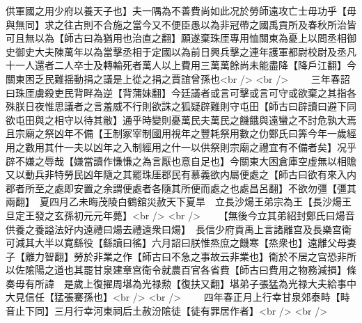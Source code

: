 供軍國之用少府以養天子也】夫一隅為不善費尚如此况於勞師遠攻亡士毋功乎【毋與無同】求之往古則不合施之當今又不便臣愚以為非冠帶之國禹貢所及春秋所治皆可且無以為【師古曰為猶用也治直之翻】願遂棄珠厓專用恤關東為憂上以問丞相御史御史大夫陳萬年以為當擊丞相于定國以為前日興兵擊之連年護軍都尉校尉及丞凡十一人還者二人卒士及轉輸死者萬人以上費用三萬萬餘尚未能盡降【降戶江翻】今關東困乏民難揺動捐之議是上從之捐之賈誼曾孫也<br />
<br />
　　三年春詔曰珠厓虜殺吏民背畔為逆【背蒲妹翻】今廷議者或言可擊或言可守或欲棄之其指各殊朕日夜惟思議者之言羞威不行則欲誅之狐疑辟難則守屯田【師古曰辟讀曰避下同欲屯田與之相守以待其敝】通乎時變則憂萬民夫萬民之饑餓與遠蠻之不討危孰大焉且宗廟之祭凶年不備【王制冢宰制國用視年之豐耗祭用數之仂鄭氏曰筭今年一歲經用之數用其什一夫以凶年之入制經用之什一以供祭則宗廟之禮宜有不備者矣】况乎辟不嫌之辱哉【嫌當讀作慊慊之為言厭也意自足也】今關東大困倉庫空虛無以相贍又以動兵非特勞民凶年隨之其罷珠厓郡民有慕義欲内屬便處之【師古曰欲有來入内郡者所至之處即安置之余謂便處者各隨其所便而處之也處昌呂翻】不欲勿彊【彊其兩翻】　夏四月乙未晦茂陵白鶴舘災赦天下夏旱　立長沙煬王弟宗為王【長沙煬王旦定王發之玄孫初元元年薨】<br />
<br />
　　【無後今立其弟紹封鄭氏曰煬音供養之養謚法好内遠禮曰煬去禮遠衆曰煬】　長信少府貢禹上言諸離宫及長樂宫衛可減其大半以寛繇役【繇讀曰徭】六月詔曰朕惟烝庶之饑寒【烝衆也】遠離父母妻子【離力智翻】勞於非業之作【師古曰不急之事故云非業也】衛於不居之宫恐非所以佐隂陽之道也其罷甘泉建章宫衛令就農百官各省費【師古曰費用之物務減損】條奏毋有所諱　是歲上復擢周堪為光禄勲【復扶又翻】堪弟子張猛為光禄大夫給事中大見信任【猛張騫孫也】<br />
<br />
　　四年春正月上行幸甘泉郊泰畤【畤音止下同】三月行幸河東祠后土赦汾隂徒【徒有罪居作者】<br />
<br />
